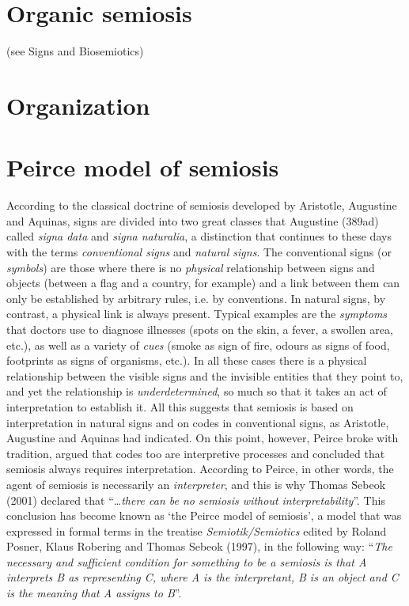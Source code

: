 \documentclass[12pt]{article}
\begin{document}
\section{Organic semiosis} (see Signs and Biosemiotics)

\hypertarget{organization}{}
\section{Organization}

\hypertarget{peirce_model_of_semiosis}{}
\section{Peirce model of semiosis}
According to the classical doctrine of semiosis developed by Aristotle, Augustine and Aquinas, signs are divided into two great classes that Augustine (389ad) called \textit{signa data} and \textit{signa naturalia}, a distinction that continues to these days with the terms \textit{conventional signs} and \textit{natural signs}. The conventional signs (or \textit{symbols}) are those where there is no \textit{physical} relationship between signs and objects (between a flag and a country, for example) and a link between them can only be established by arbitrary rules, i.e. by conventions. In natural signs, by contrast, a physical link is always present. Typical examples are the \textit{symptoms} that doctors use to diagnose illnesses (spots on the skin, a fever, a swollen area, etc.), as well as a variety of \textit{cues} (smoke as sign of fire, odours as signs of food, footprints as signs of organisms, etc.). In all these cases there is a physical relationship between the visible signs and the invisible entities that they point to, and yet the relationship is \textit{underdetermined}, so much so that it takes an act of interpretation to establish it. All this suggests that semiosis is based on interpretation in natural signs and on codes in conventional signs, as Aristotle, Augustine and Aquinas had indicated. On this point, however, Peirce broke with tradition, argued that codes too are interpretive processes and concluded that semiosis always requires interpretation. According to Peirce, in other words, the agent of semiosis is necessarily an \textit{interpreter}, and this is why Thomas Sebeok (2001) declared that ``\ldots \textit{there can be no semiosis without interpretability}''. This conclusion has become known as `the Peirce model of semiosis', a model that was expressed in formal terms in the treatise \textit{Semiotik/Semiotics} edited by Roland Posner, Klaus Robering and Thomas Sebeok (1997), in the following way: ``\textit{The necessary and sufficient condition for something to be a semiosis is that A interprets B as representing C, where A is the interpretant, B is an object and C is the meaning that A assigns to B}''.
\end{document}
